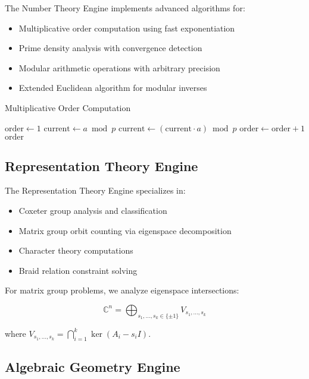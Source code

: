 \documentclass[11pt]{article}
\begin{document}
The Number Theory Engine implements advanced algorithms for:

\begin{itemize}
\item Multiplicative order computation using fast exponentiation
\item Prime density analysis with convergence detection
\item Modular arithmetic operations with arbitrary precision
\item Extended Euclidean algorithm for modular inverses
\end{itemize}

\begin{algorithm}
\caption{Multiplicative Order Computation}
\begin{algorithmic}[1]
      \EndIf
    \State $\text{order} \leftarrow 1$
    \State $\text{current} \leftarrow a \bmod p$
        \State $\text{current} \leftarrow (\text{current} \cdot a) \bmod p$
        \State $\text{order} \leftarrow \text{order} + 1$
    \EndWhile
    \Return $\text{order}$
\EndProcedure
\end{algorithmic}
\end{algorithm}

\subsection{Representation Theory Engine}

The Representation Theory Engine specializes in:

\begin{itemize}
\item Coxeter group analysis and classification
\item Matrix group orbit counting via eigenspace decomposition
\item Character theory computations
\item Braid relation constraint solving
\end{itemize}

For matrix group problems, we analyze eigenspace intersections:

$$\mathbb{C}^n = \bigoplus_{s_1,\ldots,s_k \in \{\pm 1\}} V_{s_1,\ldots,s_k}$$

where $V_{s_1,\ldots,s_k} = \bigcap_{i=1}^k \ker(A_i - s_i I)$.

\subsection{Algebraic Geometry Engine}
\end{document}
